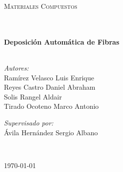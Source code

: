 \begin{titlepage}
\begin{center}
\begin{minipage}{0.9\textwidth} 
\begin{center}																	
\textsc{\LARGE Materiales Compuestos}
\end{center}
\end{minipage}\\[0.5cm]
 			\vspace*{1cm}	
\HRule \\[0.4cm]																
{ \huge \bfseries Deposición Automática de Fibras}\\[0.4cm]
\HRule \\[1.5cm]																	%
\begin{minipage}{0.96\textwidth}	
\begin{center} \large
\emph{Autores:}\\
Ramírez Velasco Luis Enrique\\
Reyes Castro Daniel Abraham\\
Solis Rangel Aldair\\
Tirado Ocoteno Marco Antonio\\
			\vspace*{0.5cm}	
\end{center}	
\end{minipage}		
\begin{minipage}{0.96\textwidth}		
\vspace{0.6cm}
\begin{center} \large														
\emph{Supervisado por:} \\							
Ávila Hernández Sergio Albano \\
\end{center}
\end{minipage}	
\begin{minipage}{0.96\textwidth}		
\vspace{0.6cm}
\begin{center} \large										\vspace*{0.5cm}
 		\\
    \vspace{0.5cm} 					
\end{center}
\end{minipage}	
																
\begin{center}
{\large \today}
 			\end{center}			
\end{center}							 						
    \end{titlepage}
